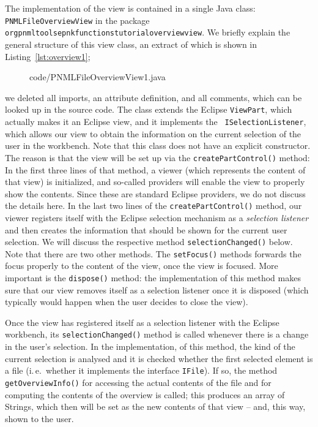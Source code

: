 The implementation of the view is contained in a single Java class: {\tt
PNMLFileOverviewView} in the package
{\tt org\qnsep{}pnml\qnsep{}tools\qnsep{}epnk\qnsep{}functions\qnsep{}tutorial\qnsep{}overviewview}.
We briefly explain the general structure of this view class, an extract
of which is shown in Listing~\ref{lst:overview1};
%
\begin{figure}[htbp!]
%
  {code/PNMLFileOverviewView1.java}
\end{figure}
%
we deleted all imports, an attribute definition, and all comments, which
can be looked up in the source code. The class extends the Eclipse
{\tt ViewPart},%
which actually makes it an Eclipse view, and it implements the {\tt
ISelectionListener},%
which allows our view to obtain the information on the
current selection of the user in the workbench.
Note that this class does not have an explicit constructor. The reason is that
the view will be set up via the {\tt createPartControl()} method:
In the first three lines of that method, a viewer (which represents the content
of that view) is initialized, and so-called providers will enable the view to
properly show the contents. Since these are standard Eclipse providers, we do
not discuss the details here.
In the last two lines of the {\tt createPartControl()} method,
our viewer registers itself with the Eclipse selection mechanism
as a \emph{selection listener}%
and then creates the information
that should be shown for the current user selection. We will discuss
the respective method {\tt selectionChanged()} below.  Note that
there are two other methods. The {\tt setFocus()} methods forwards the
focus properly to the content of the view, once the view is focused.
More important is the {\tt dispose()} method: the implementation of
this method makes sure that our view removes itself as a selection
listener once it is disposed (which typically would happen when the
user decides to close the view).

Once the view has registered itself as a selection listener with
the Eclipse workbench, its {\tt selectionChanged()} method is
called whenever there is a change in the user's selection.
In the implementation, of this method, the kind of the current
selection is analysed and it is checked whether the first
selected element is a file (i.\,e.\ whether it implements the
interface {\tt IFile}). If so, the method {\tt getOverviewInfo()}
for accessing the actual contents of the file and for computing
the contents of the overview is called; this produces an array of
Strings, which then will be set as the new contents of that view --
and, this way, shown to the user.%


